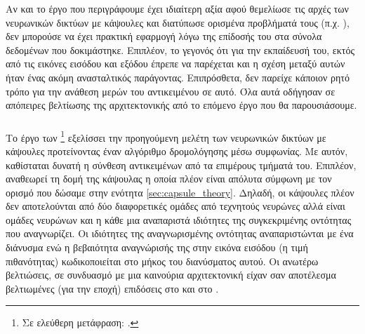 Αν και το έργο που περιγράφουμε έχει ιδιαίτερη αξία αφού θεμελίωσε τις αρχές των νευρωνικών δικτύων με κάψουλες και διατύπωσε ορισμένα προβλήματά τους (π.χ. ), δεν μπορούσε να έχει πρακτική εφαρμογή λόγω της επίδοσής του στα σύνολα δεδομένων που δοκιμάστηκε. Επιπλέον, το γεγονός ότι για την εκπαίδευσή του, εκτός από τις εικόνες εισόδου και εξόδου έπρεπε να παρέχεται και η σχέση μεταξύ αυτών ήταν ένας ακόμη ανασταλτικός παράγοντας. Επιπρόσθετα, δεν παρείχε κάποιον ρητό τρόπο για την ανάθεση μερών του αντικειμένου σε αυτό. Όλα αυτά οδήγησαν σε απόπειρες βελτίωσης της αρχιτεκτονικής από το επόμενο έργο που θα παρουσιάσουμε. 

\subsubsection{}

Το έργο των \footnote{Σε ελεύθερη μετάφραση: .} \cite{sabour2017dynamic} εξελίσσει την προηγούμενη μελέτη των νευρωνικών δικτύων με κάψουλες προτείνοντας έναν αλγόριθμο δρομολόγησης μέσω συμφωνίας. Με αυτόν, καθίσταται δυνατή η σύνθεση αντικειμένων από τα επιμέρους τμήματά του. Επιπλέον, αναθεωρεί τη δομή της κάψουλας η οποία πλέον είναι απόλυτα σύμφωνη με τον ορισμό που δώσαμε στην ενότητα \ref{sec:capsule_theory}. Δηλαδή, οι κάψουλες πλέον δεν αποτελούνται από δύο διαφορετικές ομάδες από τεχνητούς νευρώνες αλλά είναι ομάδες νευρώνων και η κάθε μια αναπαριστά ιδιότητες της συγκεκριμένης οντότητας που αναγνωρίζει. Οι ιδιότητες της αναγνωρισμένης οντότητας αναπαριστώνται με ένα διάνυσμα ενώ η βεβαιότητα αναγνώρισής της στην εικόνα εισόδου (η τιμή πιθανότητας) κωδικοποιείται στο μήκος του διανύσματος αυτού. Οι ανωτέρω βελτιώσεις, σε συνδυασμό με μια καινούρια αρχιτεκτονική είχαν σαν αποτέλεσμα βελτιωμένες (για την εποχή) επιδόσεις στο \cite{lecun1998gradientMNIST} και στο \cite{sabour2017dynamic}.\par

